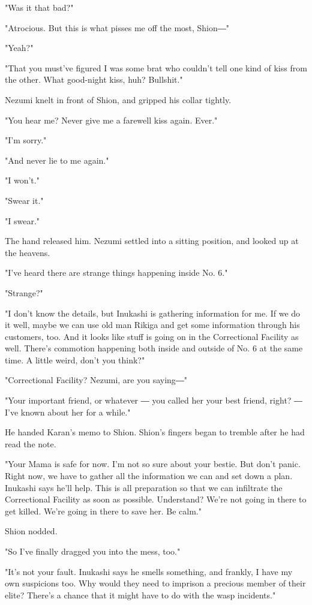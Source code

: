 "Was it that bad?"

"Atrocious. But this is what pisses me off the most, Shion―"

"Yeah?"

"That you must've figured I was some brat who couldn't tell one kind of
kiss from the other. What good-night kiss, huh? Bullshit."

Nezumi knelt in front of Shion, and gripped his collar tightly.

"You hear me? Never give me a farewell kiss again. Ever."

"I'm sorry."

"And never lie to me again."

"I won't."

"Swear it."

"I swear."

The hand released him. Nezumi settled into a sitting position, and
looked up at the heavens.

"I've heard there are strange things happening inside No. 6."

"Strange?"

"I don't know the details, but Inukashi is gathering information for me.
If we do it well, maybe we can use old man Rikiga and get some
information through his customers, too. And it looks like stuff is going
on in the Correctional Facility as well. There's commotion happening
both inside and outside of No. 6 at the same time. A little weird, don't
you think?"

"Correctional Facility? Nezumi, are you saying―"

"Your important friend, or whatever ― you called her your best friend,
right? ― I've known about her for a while."

He handed Karan's memo to Shion. Shion's fingers began to tremble after
he had read the note.

"Your Mama is safe for now. I'm not so sure about your bestie. But don't
panic. Right now, we have to gather all the information we can and set
down a plan. Inukashi says he'll help. This is all preparation so that
we can infiltrate the Correctional Facility as soon as possible.
Understand? We're not going in there to get killed. We're going in there
to save her. Be calm."

Shion nodded.

"So I've finally dragged you into the mess, too."

"It's not your fault. Inukashi says he smells something, and frankly, I
have my own suspicions too. Why would they need to imprison a precious
member of their elite? There's a chance that it might have to do with
the wasp incidents."

